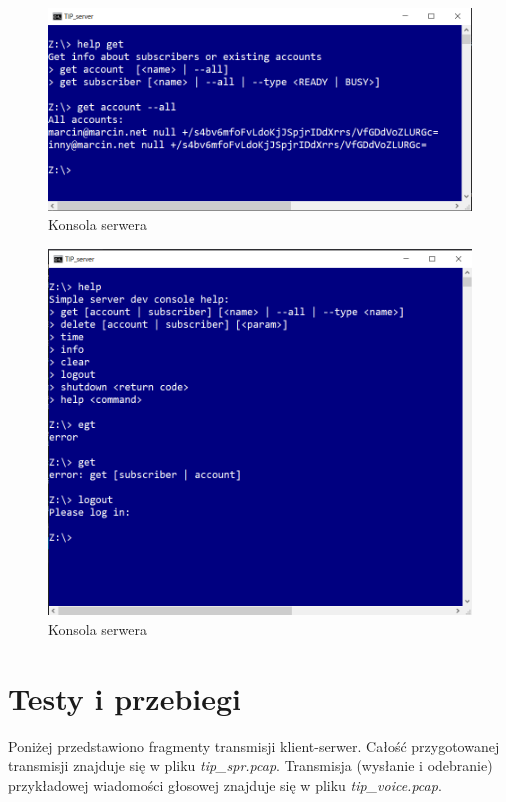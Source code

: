 \documentclass[12pt,a4paper]{article}
\begin{document}
	\pagebreak
	\begin{figure}[h!]
		\begin{center}
			\includegraphics*[width=.8\textwidth]{serwer_2.png}
		\end{center}
		\caption{Konsola serwera}
	\end{figure}
	
	\begin{figure}[h!]
		\begin{center}
			\includegraphics*[width=.8\textwidth]{serwer_3.png}
		\end{center}
		\caption{Konsola serwera}
	\end{figure}
	
	
	
	\pagebreak
	\section{Testy i przebiegi}
	\par Poniżej przedstawiono fragmenty transmisji klient-serwer. Całość przygotowanej transmisji znajduje się w pliku
	\textit{tip\_spr.pcap}. Transmisja (wysłanie i odebranie) przykładowej wiadomości głosowej znajduje się w pliku \textit{tip\_voice.pcap}.
	
\end{document}
